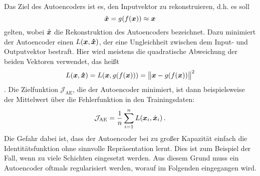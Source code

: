 Das Ziel des Autoencoders ist es, den Inputvektor zu rekonstruieren, d.h. es soll
\begin{equation}
	\hat{\bm{x}} = g(f(\bm{x})) \approx \bm{x}
\end{equation}
gelten, wobei $\hat{\bm{x}}$ die Rekonstruktion des Autoencoders bezeichnet.
Dazu minimiert der Autoencoder einen  $L(\bm{x}, \bm{\hat{x}})$, der eine Ungleichheit zwischen dem Input- und Outputvektor bestraft. Hier wird meistens die quadratische Abweichung der beiden Vektoren verwendet, das heißt
\begin{equation}
	\label{eq:MSE_loss}
	L(\vect{x}, \vect{\estNormal{x}}) = L(\vect{x}, g(f(\vect{x}))) = \norm[\big]{\vect{x} - g(f(\vect{x}))}^2
\end{equation}
\parencite[507]{Goodfellow.2016}. Die Zielfunktion $\mathcal{J}_{\text{AE}}$, die der Autoencoder
minimiert, ist dann beispielsweise der Mittelwert über die Fehlerfunktion in den Trainingsdaten:
\begin{equation}
	\label{eq:AE_objectiveFunction}
	\mathcal{J}_{\text{AE}} = \frac{1}{n} \sum_{i = 1}^n L(\vect{x}_i, \estNormal{\vect{x}}_i) \, .
\end{equation}
Die Gefahr dabei ist, dass der Autoencoder bei zu großer Kapazität einfach die Identitätsfunktion
ohne sinnvolle Repräsentation lernt. Dies ist zum Beispiel der Fall, wenn zu viele Schichten
eingesetzt werden. Aus diesem
Grund muss ein Autoencoder oftmals regularisiert werden, worauf im Folgenden eingegangen wird.

